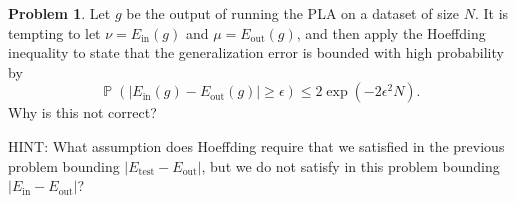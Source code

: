 \documentclass[10pt]{exam}
\theoremstyle{definition}
\newtheorem{problem}{Problem}
\DeclareMathOperator{\prob}{\mathbb P}
\newcommand{\Ein}{E_{\text{in}}}
\newcommand{\Eout}{E_{\text{out}}}
\newcommand{\Etest}{E_{\text{test}}}
\begin{document}
\newpage
\begin{problem}
Let $g$ be the output of running the PLA on a dataset of size $N$.
It is tempting to
let $\nu = \Ein(g)$ and $\mu=\Eout(g)$,
and then apply the Hoeffding inequality to state that the generalization error 
is bounded with high probability by
$$
    \prob(|\Ein(g) - \Eout(g)| \ge \epsilon) \le 2 \exp(-2\epsilon^2 N).
$$
Why is this not correct?

HINT: What assumption does Hoeffding require that we satisfied in the previous problem bounding $|\Etest - \Eout|$, but we do not satisfy in this problem bounding $|\Ein - \Eout|$?
\end{problem}
\end{document}
